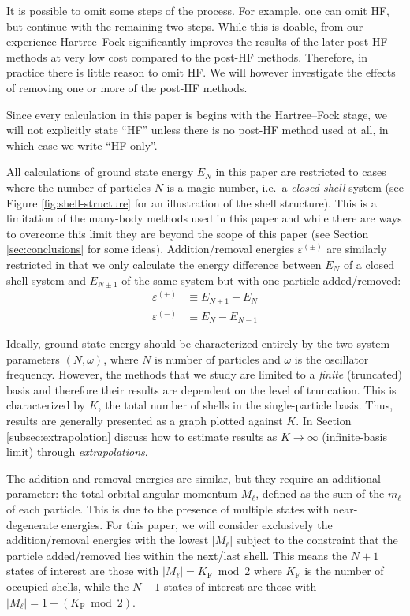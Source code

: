 It is possible to omit some steps of the process.  For example, one can omit HF, but continue with the remaining two steps.  While this is doable, from our experience Hartree--Fock significantly improves the results of the later post-HF methods at very low cost compared to the post-HF methods.  Therefore, in practice there is little reason to omit HF.  We will however investigate the effects of removing one or more of the post-HF methods.

Since every calculation in this paper is begins with the Hartree--Fock stage, we will not explicitly state ``HF'' unless there is no post-HF method used at all, in which case we write ``HF only''.

All calculations of ground state energy $E_N$ in this paper are restricted to cases where the number of particles $N$ is a magic number, i.e.\ a \textit{closed shell} system (see Figure \ref{fig:shell-structure} for an illustration of the shell structure).  This is a limitation of the many-body methods used in this paper and while there are ways to overcome this limit they are beyond the scope of this paper (see Section \ref{sec:conclusions} for some ideas).  Addition/removal energies $\varepsilon^{(\pm)}$ are similarly restricted in that we only calculate the energy difference between $E_N$ of a closed shell system and $E_{N \pm 1}$ of the same system but with one particle added/removed:
\begin{align*}
  \varepsilon^{(+)} &\equiv E_{N + 1} - E_N \\
  \varepsilon^{(-)} &\equiv E_N - E_{N - 1}
\end{align*}

Ideally, ground state energy should be characterized entirely by the two system parameters $(N, \omega)$, where $N$ is number of particles and $\omega$ is the oscillator frequency.  However, the methods that we study are limited to a \emph{finite} (truncated) basis and therefore their results are dependent on the level of truncation.  This is characterized by $K$, the total number of shells in the single-particle basis.  Thus, results are generally presented as a graph plotted against $K$.  In Section \ref{subsec:extrapolation} discuss how to estimate results as $K \to \infty$ (infinite-basis limit) through \textit{extrapolations}.

The addition and removal energies are similar, but they require an additional parameter: the total orbital angular momentum $M_\ell$, defined as the sum of the $m_\ell$ of each particle.  This is due to the presence of multiple states with near-degenerate energies.  For this paper, we will consider exclusively the addition/removal energies with the lowest $|M_\ell|$ subject to the constraint that the particle added/removed lies within the next/last shell.  This means the $N + 1$ states of interest are those with $|M_\ell| = K_{\mathrm{F}} \bmod 2$ where $K_{\mathrm{F}}$ is the number of occupied shells, while the $N - 1$ states of interest are those with $|M_\ell| = 1 - (K_{\mathrm{F}} \bmod 2)$.

